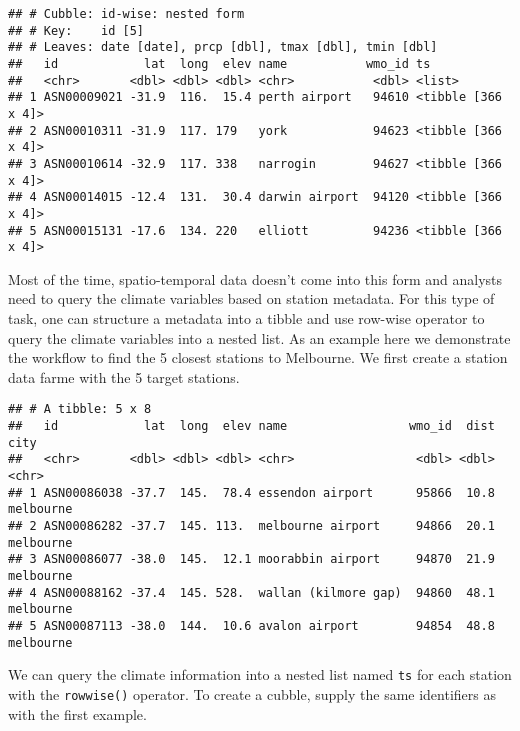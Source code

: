 \documentclass{article}
\begin{document}
\begin{verbatim}
## # Cubble: id-wise: nested form
## # Key:    id [5]
## # Leaves: date [date], prcp [dbl], tmax [dbl], tmin [dbl]
##   id            lat  long  elev name           wmo_id ts                
##   <chr>       <dbl> <dbl> <dbl> <chr>           <dbl> <list>            
## 1 ASN00009021 -31.9  116.  15.4 perth airport   94610 <tibble [366 x 4]>
## 2 ASN00010311 -31.9  117. 179   york            94623 <tibble [366 x 4]>
## 3 ASN00010614 -32.9  117. 338   narrogin        94627 <tibble [366 x 4]>
## 4 ASN00014015 -12.4  131.  30.4 darwin airport  94120 <tibble [366 x 4]>
## 5 ASN00015131 -17.6  134. 220   elliott         94236 <tibble [366 x 4]>
\end{verbatim}

Most of the time, spatio-temporal data doesn't come into this form and
analysts need to query the climate variables based on station metadata.
For this type of task, one can structure a metadata into a tibble and
use row-wise operator to query the climate variables into a nested list.
As an example here we demonstrate the workflow to find the 5 closest
stations to Melbourne. We first create a station data farme with the 5
target stations.

\begin{verbatim}
## # A tibble: 5 x 8
##   id            lat  long  elev name                 wmo_id  dist city     
##   <chr>       <dbl> <dbl> <dbl> <chr>                 <dbl> <dbl> <chr>    
## 1 ASN00086038 -37.7  145.  78.4 essendon airport      95866  10.8 melbourne
## 2 ASN00086282 -37.7  145. 113.  melbourne airport     94866  20.1 melbourne
## 3 ASN00086077 -38.0  145.  12.1 moorabbin airport     94870  21.9 melbourne
## 4 ASN00088162 -37.4  145. 528.  wallan (kilmore gap)  94860  48.1 melbourne
## 5 ASN00087113 -38.0  144.  10.6 avalon airport        94854  48.8 melbourne
\end{verbatim}

We can query the climate information into a nested list named
\texttt{ts} for each station with the \texttt{rowwise()} operator. To
create a cubble, supply the same identifiers as with the first example.
\end{document}
